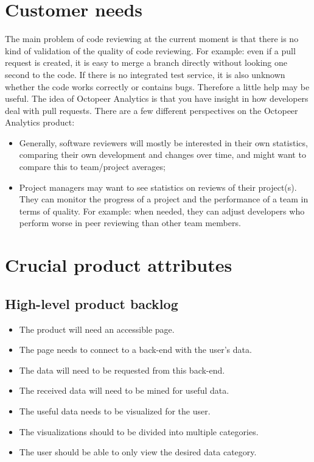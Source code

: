 \documentclass{article}
\begin{document}
\section{Customer needs} \label{section:customerneeds}
The main problem of code reviewing at the current moment is that there is no kind of validation of the quality of code reviewing. For example: even if a pull request is created, it is easy to merge a branch directly without looking one second to the code. If there is no integrated test service, it is also unknown whether the code works correctly or contains bugs. Therefore a little help may be useful. The idea of Octopeer Analytics is that you have insight in how developers deal with pull requests. There are a few different perspectives on the Octopeer Analytics product:
\begin{itemize}
\item Generally, software reviewers will mostly be interested in their own statistics, comparing their own development and changes over time, and might want to compare this to team/project averages;
\item Project managers may want to see statistics on reviews of their project(s). They can monitor the progress of a project and the performance of a team in terms of quality. For example: when needed, they can adjust developers who perform worse in peer reviewing than other team members.
\end{itemize}

\section{Crucial product attributes} \label{section:crucialproductattributes}
\subsection{High-level product backlog} \label{section:highlevelproductbacklog}
    
    \begin{itemize}
        \item The product will need an accessible page.
        \item The page needs to connect to a back-end with the user's data.
        \item The data will need to be requested from this back-end.
        \item The received data will need to be mined for useful data.
        \item The useful data needs to be visualized for the user.
        \item The visualizations should to be divided into multiple categories.
        \item The user should be able to only view the desired data category.
    \end{itemize}
\end{document}
